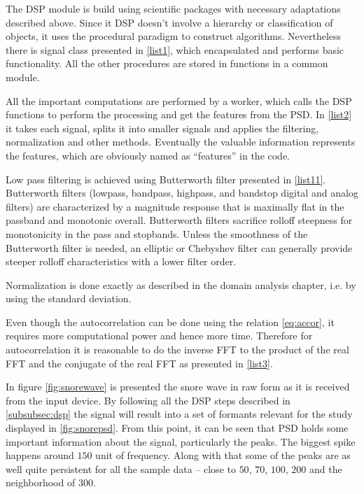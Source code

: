 The DSP module is build using scientific packages with necessary adaptations described above. Since it DSP doesn't involve a hierarchy or classification of objects, it uses the procedural paradigm to construct algorithms. Nevertheless there is signal class presented in \ref{list1}, which encapsulated and performs basic functionality. All the other procedures are stored in functions in a common module.

All the important computations are performed by a worker, which calls the DSP functions to perform the processing and get the features from the PSD. In \ref{list2} it takes each signal, splits it into smaller signals and applies the filtering, normalization and other methods. Eventually the valuable information represents the features, which are obviously named as ``features'' in the code.



Low pass filtering is achieved using Butterworth filter presented in \ref{list11}. Butterworth filters (lowpass, bandpass, highpass, and bandstop digital and analog filters) are characterized by a magnitude response that is maximally flat in the passband and monotonic overall. Butterworth filters sacrifice rolloff steepness for monotonicity in the pass and stopbands. Unless the smoothness of the Butterworth filter is needed, an elliptic or Chebyshev filter can generally provide steeper rolloff characteristics with a lower filter order.



Normalization is done exactly as described in the domain analysis chapter, i.e. by using the standard deviation.



Even though the autocorrelation can be done using the relation \eqref{eq:accor}, it requires more computational power and hence more time. Therefore for autocorrelation it is reasonable to do the inverse FFT to the product of the real FFT and the conjugate of the real FFT as presented in \ref{list3}.



In figure \ref{fig:snorewave} is presented the snore wave in raw form as it is received from the input device. By following all the DSP steps described in \ref{subsubsec:dsp} the signal will result into a set of formants relevant for the study displayed in \ref{fig:snorepsd}. From this point, it can be seen that PSD holds some important information about the signal, particularly the peaks. The biggest spike happens around $150$ unit of frequency. Along with that some of the peaks are as well quite persistent for all the sample data -- close to $50$, $70$, $100$, $200$ and the neighborhood of $300$. 

